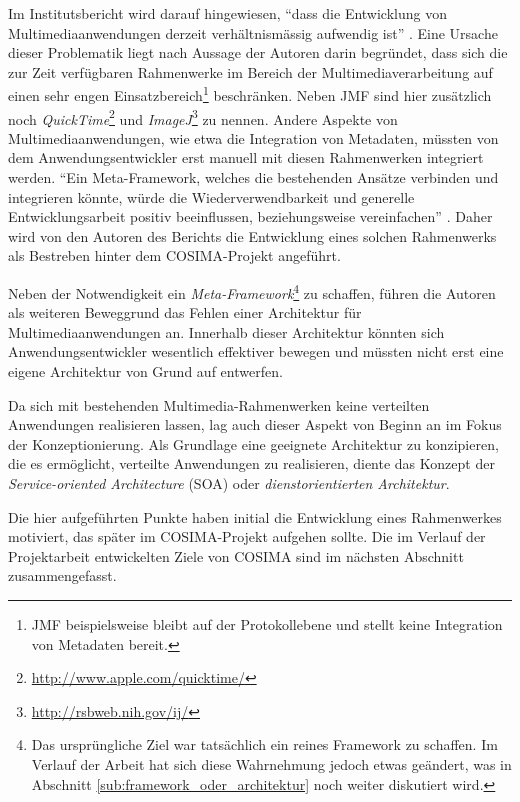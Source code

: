   Im Institutsbericht wird darauf hingewiesen, "`dass die Entwicklung von Multimediaanwendungen derzeit verhältnismässig aufwendig ist"' \citep[S. 2]{bericht}. Eine Ursache dieser Problematik liegt nach Aussage der Autoren darin begründet, dass sich die zur Zeit verfügbaren Rahmenwerke im Bereich der Multimediaverarbeitung auf einen sehr engen Einsatzbereich\footnote{JMF beispielsweise bleibt auf der Protokollebene und stellt keine Integration von Metadaten bereit.} beschränken. Neben JMF sind hier zusätzlich noch \emph{QuickTime}\footnote{\url{http://www.apple.com/quicktime/}} und \emph{ImageJ}\footnote{\url{http://rsbweb.nih.gov/ij/}} zu nennen. Andere Aspekte von Multimediaanwendungen, wie etwa die Integration von Metadaten, müssten von dem Anwendungsentwickler erst manuell mit diesen Rahmenwerken integriert werden. "`Ein Meta-Framework, welches die bestehenden Ansätze verbinden und integrieren könnte, würde die Wiederverwendbarkeit und generelle Entwicklungsarbeit positiv beeinflussen, beziehungsweise vereinfachen"' \citep[S. 3]{bericht}. Daher wird von den Autoren des Berichts die Entwicklung eines solchen Rahmenwerks als Bestreben hinter dem COSIMA-Projekt angeführt.
  
  Neben der Notwendigkeit ein \emph{Meta-Framework}\footnote{Das ursprüngliche Ziel war tatsächlich ein reines Framework zu schaffen. Im Verlauf der Arbeit hat sich diese Wahrnehmung jedoch etwas geändert, was in Abschnitt \ref{sub:framework_oder_architektur} noch weiter diskutiert wird.} zu schaffen, führen die Autoren als weiteren Beweggrund das Fehlen einer Architektur für Multimediaanwendungen an. Innerhalb dieser Architektur könnten sich Anwendungsentwickler wesentlich effektiver bewegen und müssten nicht erst eine eigene Architektur von Grund auf entwerfen.
  
  Da sich mit bestehenden Multimedia-Rahmenwerken keine verteilten Anwendungen realisieren lassen, lag auch dieser Aspekt von Beginn an im Fokus der Konzeptionierung. Als Grundlage eine geeignete Architektur zu konzipieren, die es ermöglicht, verteilte Anwendungen zu realisieren, diente das Konzept der \emph{Service-oriented Architecture} (SOA) oder \emph{dienstorientierten Architektur}.
  
  Die hier aufgeführten Punkte haben initial die Entwicklung eines Rahmenwerkes motiviert, das später im COSIMA-Projekt aufgehen sollte. Die im Verlauf der Projektarbeit entwickelten Ziele von COSIMA sind im nächsten Abschnitt zusammengefasst.

